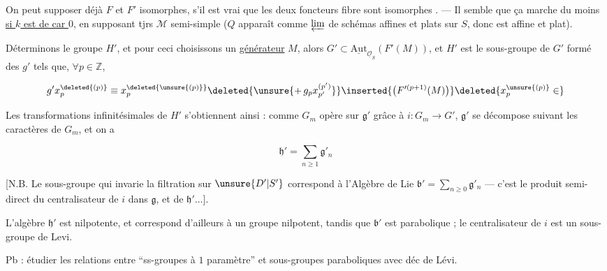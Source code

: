 
On peut supposer déjà $F$ et $F'$ isomorphes,  s'il est vrai que les deux foncteurs fibre sont isomorphes . --- Il semble que ça marche du moins  \uline{si $k$ est de car $0$}, en supposant tjrs $\mathcal M$ semi-simple ($Q$ apparaît comme $\varprojlim$ de schémas affines et plats sur $S$, donc est affine et plat).


Déterminons le groupe $H'$, et pour ceci choisissons un \uline{générateur} $M$, alors $G'\subset\underline{\mathrm{Aut}}_{\underline{\mathcal O}_S}(F'(M))$, et $H'$ est le sous-groupe de $G'$ formé des $g'$ tels que, $\forall p\in\mathbb Z$,

\[
g'x_{p}^{\deleted{(p)}}\equiv x_{p}^{\deleted{\unsure{(p)}}}
\deleted{\unsure{+\,g_p x_{p'}^{(p')}}}
\inserted{\bigl(F'^{(p+1)}(M)\bigr)}
\deleted{x_{p}^{\unsure{(p)}}\in}
\]

Les transformations infinitésimales de $H'$ s'obtiennent ainsi : comme $G_m$ opère sur $\mathfrak g'$ grâce à $i:G_m\longrightarrow G'$, $\mathfrak g'$ se décompose suivant les caractères de $G_m$, et on a


\[
\boxed{\mathfrak h'=\sum_{n\geq1}\mathfrak g'_n}
\]


[N.B. Le sous-groupe qui invarie la filtration sur $\unsure{D'|S'}$ correspond à l'Algèbre de Lie $\mathfrak b'=\sum_{n\geq0}\mathfrak g'_n$ --- c'est le produit semi-direct du centralisateur de $i$ dans $\mathfrak g$, et de $\mathfrak h'\ldots$].


 L'algèbre $\mathfrak h'$ est nilpotente, et correspond d'ailleurs à un groupe  nilpotent, tandis que $\mathfrak b'$ est parabolique ; le centralisateur de $i$  est un sous-groupe de Levi.

Pb : étudier les relations entre ``ss-groupes à $1$ paramètre'' et sous-groupes paraboliques avec déc de Lévi.

